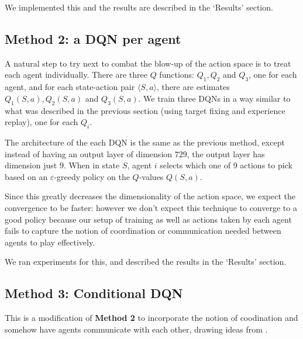 \documentclass{article}
\begin{document}
We implemented this and the results are described in
the `Results' section.

\subsection{Method 2: a DQN per agent}
A natural step to try next to combat the blow-up
of the action space is to treat each agent
individually. There are three $Q$ functions:
$Q_1, Q_2$ and $Q_3$, one for each agent, and
for each state-action pair $\langle S,a\rangle$,
there are estimates $Q_1(S,a),Q_2(S,a)$ and
$Q_3(S,a)$. We train three DQNs in a way similar
to what was described in the previous section
(using target fixing and experience replay), one for
each $Q_i$.

The architecture of the each DQN is the same as the
previous method, except instead of having an output
layer of dimension $729$, the output layer has dimension
just $9$. When in state $S$, agent $i$ selects which one
of 9 actions to pick based on an $\varepsilon$-greedy policy
on the $Q$-values $Q(S,a)$.

Since this greatly decreases the dimensionality of
the action space, we expect the convergence to be
faster: however we don't expect this technique to
converge to a good policy because our setup
of training as well as actions taken by each agent
fails to capture the notion of coordination or
communication needed between agents to play effectively.

We ran experiments for this, and described the results in
the `Results' section.

\subsection{Method 3: Conditional DQN}
This is a modification of \textbf{Method 2} to incorporate
the notion of coodination and somehow have agents communicate
with each other, drawing ideas from \cite{foerster2016learning}.
\end{document}
